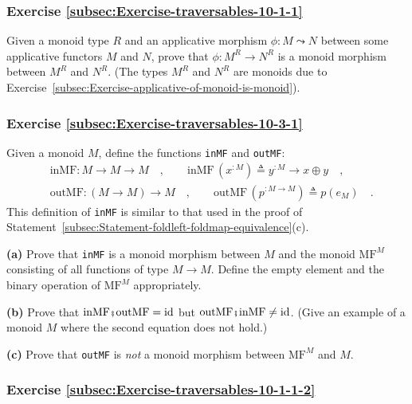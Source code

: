 \subsubsection{Exercise \label{subsec:Exercise-traversables-10-1-1}\ref{subsec:Exercise-traversables-10-1-1}}

Given a monoid type $R$ and an applicative morphism $\phi:M\leadsto N$
between some applicative functors $M$ and $N$, prove that $\phi:M^{R}\rightarrow N^{R}$
is a monoid morphism between $M^{R}$ and $N^{R}$. (The types $M^{R}$
and $N^{R}$ are monoids due to Exercise~\ref{subsec:Exercise-applicative-of-monoid-is-monoid}).

\subsubsection{Exercise \label{subsec:Exercise-traversables-10-3-1}\ref{subsec:Exercise-traversables-10-3-1}}

Given a monoid $M$, define the functions \lstinline!inMF! and \lstinline!outMF!:
\begin{align*}
 & \text{inMF}:M\rightarrow M\rightarrow M\quad,\quad\quad\text{inMF}\,(x^{:M})\triangleq y^{:M}\rightarrow x\oplus y\quad,\\
 & \text{outMF}:(M\rightarrow M)\rightarrow M\quad,\quad\quad\text{outMF}\,(p^{:M\rightarrow M})\triangleq p(e_{M})\quad.
\end{align*}
This definition of \lstinline!inMF! is similar to that used in the
proof of Statement~\ref{subsec:Statement-foldleft-foldmap-equivalence}(c).

\textbf{(a)} Prove that \lstinline!inMF! is a monoid morphism between
$M$ and the monoid $\text{MF}^{M}$ consisting of all functions of
type $M\rightarrow M$. Define the empty element and the binary operation
of $\text{MF}^{M}$ appropriately.

\textbf{(b)} Prove that $\text{inMF}\bef\text{outMF}=\text{id}$ but
$\text{outMF}\bef\text{inMF}\neq\text{id}$. (Give an example of a
monoid $M$ where the second equation does not hold.)

\textbf{(c)} Prove that \lstinline!outMF! is \emph{not} a monoid
morphism between $\text{MF}^{M}$ and $M$.

\subsubsection{Exercise \label{subsec:Exercise-traversables-10-1-1-2}\ref{subsec:Exercise-traversables-10-1-1-2}}

